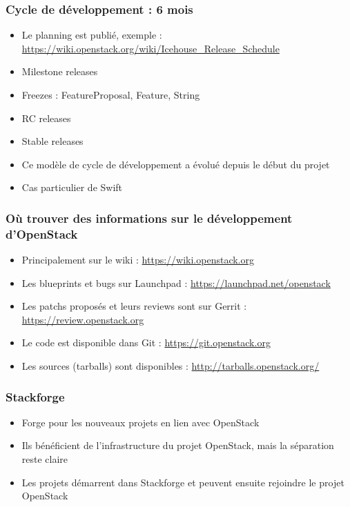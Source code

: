   \begin{frame}
    \frametitle{Cycle de développement : 6 mois}
    \begin{itemize}
      \item Le planning est publié, exemple : \url{https://wiki.openstack.org/wiki/Icehouse_Release_Schedule}
      \item Milestone releases
      \item Freezes : FeatureProposal, Feature, String
      \item RC releases
      \item Stable releases
      \item Ce modèle de cycle de développement a évolué depuis le début du projet
      \item Cas particulier de Swift
    \end{itemize}
  \end{frame}

  \begin{frame}
    \frametitle{Où trouver des informations sur le développement d'OpenStack}
    \begin{itemize}
      \item Principalement sur le wiki : \url{https://wiki.openstack.org}
      \item Les blueprints et bugs sur Launchpad : \url{https://launchpad.net/openstack}
      \item Les patchs proposés et leurs reviews sont sur Gerrit : \url{https://review.openstack.org}
      \item Le code est disponible dans Git : \url{https://git.openstack.org}
      \item Les sources (tarballs) sont disponibles : \url{http://tarballs.openstack.org/}
    \end{itemize}
  \end{frame}

  \begin{frame}
    \frametitle{Stackforge}
    \begin{itemize}
      \item Forge pour les nouveaux projets en lien avec OpenStack
      \item Ils bénéficient de l'infrastructure du projet OpenStack, mais la séparation reste claire
      \item Les projets démarrent dans Stackforge et peuvent ensuite rejoindre le projet OpenStack
    \end{itemize}
  \end{frame}

